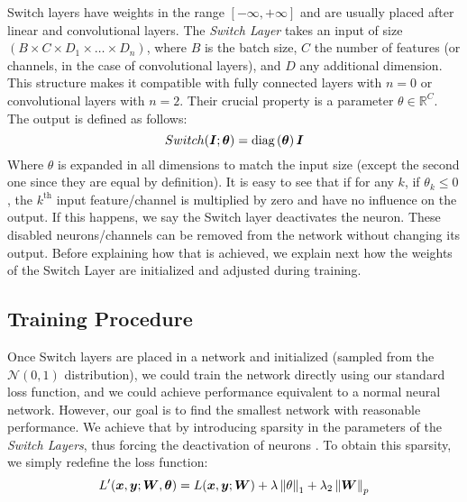 Switch layers have weights in the range $[-\infty,+\infty]$ and are usually placed after
linear and convolutional layers.
The \textit{Switch Layer} takes an input of size $\left(B \times C \times D_1
  \times \dots \times D_n\right)$, where $B$ is the batch size, $C$ the number
of features (or channels, in the case of convolutional layers), and $D$ any
additional dimension. This structure makes it compatible with fully connected
layers with $n=0$ or convolutional layers with $n=2$. Their crucial property is
a parameter $\theta \in \mathbb{R}^C$. The output is defined as follows: \vspace{-1em}
\begin{equation} Switch(\bm{I};\bm{\theta}) = \text{diag}\left(\bm{\theta}\right) \bm{I}  \end{equation}
Where $\theta$ is expanded in all
dimensions to match the input size (except the second one since they are equal
by definition). It is easy to see that if for any $k$, if $\theta_k \leq 0$,
the $k^{\text{th}}$ input feature/channel is multiplied by zero and have no
influence on the output. If this happens, we say the Switch layer deactivates
the neuron. These disabled neurons/channels can be removed from the network
without changing its output. Before explaining how that is achieved, we explain
next how the weights of the Switch Layer are initialized and adjusted during
training.

\subsection{Training Procedure} Once Switch layers are placed in a network and
initialized (sampled from the $\mathcal{N}(0, 1)$ distribution),
we could train the network directly using our standard loss function, and we could achieve performance equivalent to a normal neural
network. However, our goal is to find the smallest network with reasonable
performance. We achieve that by introducing sparsity in the parameters of the
\textit{Switch Layers}, thus forcing the deactivation of neurons%
. To obtain this sparsity, we simply redefine the loss function:
\begin{equation}
  L'(\bm{x},\bm{y};\bm{W}, \bm{\theta}) = L(\bm{x}, \bm{y}; \bm{W}) +
  \lambda\left\lVert\theta\right\rVert_1 + \lambda_2\left\lVert\bm{W}\right\rVert_p
\end{equation}

